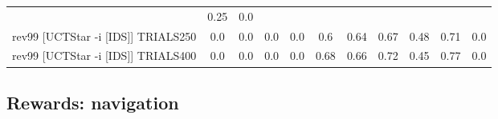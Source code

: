 \documentclass{article}
\begin{document}
\begin{tabular}{|l|r@{$\pm$}rr@{$\pm$}rr@{$\pm$}rr@{$\pm$}rr@{$\pm$}rr@{$\pm$}rr@{$\pm$}rr@{$\pm$}rr@{$\pm$}rr@{$\pm$}r|}
& \multicolumn{2}{c}{0.25}
& \multicolumn{2}{c|}{0.0}
\\
rev99 [UCTStar -i [IDS]] TRIALS250
& \multicolumn{2}{c}{0.0}
& \multicolumn{2}{c}{0.0}
& \multicolumn{2}{c}{0.0}
& \multicolumn{2}{c}{0.0}
& \multicolumn{2}{c}{0.6}
& \multicolumn{2}{c}{0.64}
& \multicolumn{2}{c}{0.67}
& \multicolumn{2}{c}{0.48}
& \multicolumn{2}{c}{0.71}
& \multicolumn{2}{c|}{0.0}
\\
rev99 [UCTStar -i [IDS]] TRIALS400
& \multicolumn{2}{c}{0.0}
& \multicolumn{2}{c}{0.0}
& \multicolumn{2}{c}{0.0}
& \multicolumn{2}{c}{0.0}
& \multicolumn{2}{c}{0.68}
& \multicolumn{2}{c}{0.66}
& \multicolumn{2}{c}{0.72}
& \multicolumn{2}{c}{0.45}
& \multicolumn{2}{c}{0.77}
& \multicolumn{2}{c|}{0.0}
\\
\hline
\end{tabular}%

\bigskip

\subsection*{Rewards: navigation}
\end{document}
